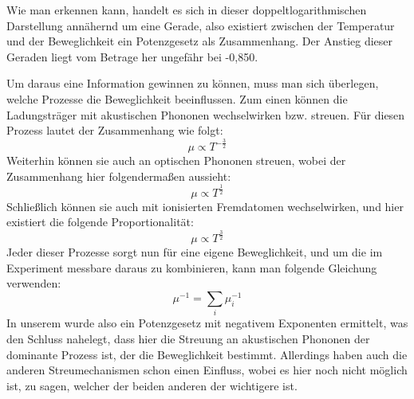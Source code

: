 Wie man erkennen kann, handelt es sich in dieser doppeltlogarithmischen
Darstellung annähernd um eine Gerade, also existiert zwischen der Temperatur
und der Beweglichkeit ein Potenzgesetz als Zusammenhang. Der Anstieg dieser
Geraden liegt vom Betrage her ungefähr bei -0,850.

Um daraus eine Information gewinnen zu können, muss man sich überlegen, welche
Prozesse die Beweglichkeit beeinflussen. Zum einen können die Ladungsträger mit
akustischen Phononen wechselwirken bzw. streuen. Für diesen Prozess lautet der
Zusammenhang wie folgt:
\begin{equation}
μ \propto T^{-\frac{3}{2}}
\end{equation}
Weiterhin können sie auch an optischen Phononen streuen, wobei der Zusammenhang
hier folgendermaßen aussieht:
\begin{equation}
μ \propto T^{\frac{1}{2}}
\end{equation}
Schließlich können sie auch mit ionisierten Fremdatomen wechselwirken, und hier
existiert die folgende Proportionalität:
\begin{equation}
μ \propto T^{\frac{3}{2}}
\end{equation}
Jeder dieser Prozesse sorgt nun für eine eigene Beweglichkeit, und um die im
Experiment messbare daraus zu kombinieren, kann man folgende Gleichung
verwenden:
\begin{equation}
μ^{-1} = \sum_i μ_i^{-1}
\end{equation}
In unserem wurde also ein Potenzgesetz mit negativem Exponenten ermittelt, was
den Schluss nahelegt, dass hier die Streuung an akustischen Phononen der
dominante Prozess ist, der die Beweglichkeit bestimmt. Allerdings haben auch
die anderen Streumechanismen schon einen Einfluss, wobei es hier noch nicht
möglich ist, zu sagen, welcher der beiden anderen der wichtigere ist.
